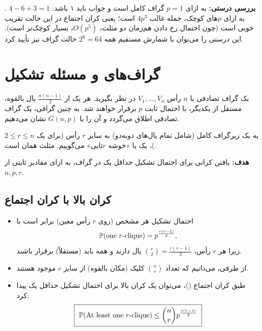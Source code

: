 \begin{note}
\notetitle \textbf{بررسی درستی:} به ازای $p=1$ گراف کامل است و جواب باید ۱ باشد: $4-6+3=1$ \checkmark. به ازای $p$های کوچک، جمله غالب $4p^3$ است؛ یعنی کران اجتماع در این حالت تقریب خوبی است (چون احتمال رخ دادن هم‌زمان دو مثلث، $O(p^5)$، بسیار کوچک‌تر است). این درستی را می‌توان با شمارش مستقیم همه $2^6=64$ حالت گراف نیز تأیید کرد.
\end{note}

\begin{center}
\end{center}

\section{گراف‌های  و مسئله تشکیل }

\begin{definition}
یک گراف تصادفی با $n$ رأس $V_1,\ldots,V_n$ در نظر بگیرید. هر یک از $\frac{n(n-1)}{2}$ یال بالقوه، مستقل از یکدیگر، با احتمال ثابت $p$ برقرار خواهند شد. به چنین گرافی، یک گراف تصادفی  اطلاق می‌گردد و آن را با $G(n,p)$ نشان می‌دهیم.
\end{definition}

\begin{definition}[\lr{$r$-clique}]
به یک زیرگراف کامل (شامل تمام یال‌های دوبه‌دو) به سایز $r$ رأس (برای یک $2\le r\le n$)، یک  یا «خوشه $r$تایی» می‌گوییم. مثلث همان  است.
\end{definition}

\textbf{هدف:} یافتن کرانی برای احتمال تشکیل حداقل یک  در گراف، به ازای مقادیر ثابتی از $n,p,r$.

\subsection{کران بالا با کران اجتماع}
\begin{itemize}
\item احتمال تشکیل هر  مشخص (روی $r$ رأس معین) برابر است با
\[
\mathbb{P}(\text{one } r\text{-clique})=p^{\frac{r(r-1)}{2}},
\]
زیرا هر $r$ رأس، $\binom r2=\frac{r(r-1)}2$ یال دارند و همه باید (مستقلاً) برقرار باشند.
\item از طرفی، می‌دانیم که تعداد $\binom nr$ کلیک (مکان بالقوه) از سایز $r$ موجود هستند.
\item طبق کران اجتماع ()، می‌توان یک کران بالا برای احتمال تشکیل حداقل یک  پیدا کرد:
\[
\boxed{\ \Prob(\text{At least one } r\text{-clique})\le\binom nr p^{\frac{r(r-1)}{2}}\ }
\]
\end{itemize}

